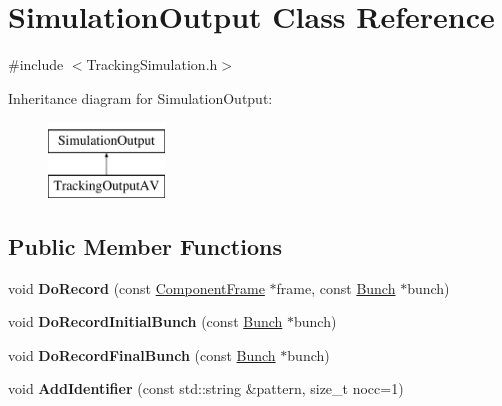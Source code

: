 \hypertarget{classSimulationOutput}{}\section{Simulation\+Output Class Reference}
\label{classSimulationOutput}


{\ttfamily \#include $<$Tracking\+Simulation.\+h$>$}

Inheritance diagram for Simulation\+Output\+:\begin{figure}[H]
\begin{center}
\leavevmode
\includegraphics[height=2.000000cm]{classSimulationOutput}
\end{center}
\end{figure}
\subsection*{Public Member Functions}
\begin{DoxyCompactItemize}
\item 
\mbox{\label{classSimulationOutput_aa338acfa9cb867ed9be4da6dbdf040fe}} 
void {\bfseries Do\+Record} (const \hyperlink{classComponentFrame}{Component\+Frame} $\ast$frame, const \hyperlink{classBunch}{Bunch} $\ast$bunch)
\item 
\mbox{\label{classSimulationOutput_aabde2d18fc675c6358fae45fbd1eaf0d}} 
void {\bfseries Do\+Record\+Initial\+Bunch} (const \hyperlink{classBunch}{Bunch} $\ast$bunch)
\item 
\mbox{\label{classSimulationOutput_ad8b80c4cbf28645e769f5e0e656f2359}} 
void {\bfseries Do\+Record\+Final\+Bunch} (const \hyperlink{classBunch}{Bunch} $\ast$bunch)
\item 
\mbox{\label{classSimulationOutput_a4faab2be8660c4fa405d6de7e907447c}} 
void {\bfseries Add\+Identifier} (const std\+::string \&pattern, size\+\_\+t nocc=1)
\end{DoxyCompactItemize}
